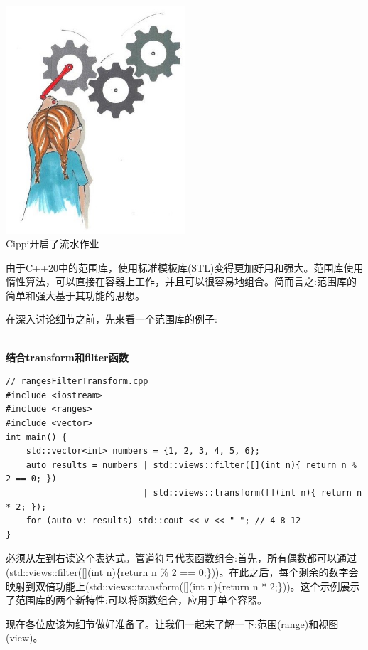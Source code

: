 \begin{center}
\includegraphics[width=0.5\textwidth]{content/3/chapter5/images/2.png}\\
Cippi开启了流水作业
\end{center}

由于C++20中的范围库，使用标准模板库(STL)变得更加好用和强大。范围库使用惰性算法，可以直接在容器上工作，并且可以很容易地组合。简而言之:范围库的简单和强大基于其功能的思想。

在深入讨论细节之前，先来看一个范围库的例子:

\hspace*{\fill} \\ %
\noindent
\textbf{结合transform和filter函数}
\begin{lstlisting}[style=styleCXX]
// rangesFilterTransform.cpp
#include <iostream>
#include <ranges>
#include <vector>
int main() {
	std::vector<int> numbers = {1, 2, 3, 4, 5, 6};
	auto results = numbers | std::views::filter([](int n){ return n % 2 == 0; })
						   | std::views::transform([](int n){ return n * 2; });
	for (auto v: results) std::cout << v << " "; // 4 8 12
}
\end{lstlisting}

必须从左到右读这个表达式。管道符号代表函数组合:首先，所有偶数都可以通过(std::views::filter([](int n)\{return n \% 2 == 0;\}))。在此之后，每个剩余的数字会映射到双倍功能上(std::views::transform([](int n)\{return n * 2;\}))。这个示例展示了范围库的两个新特性:可以将函数组合，应用于单个容器。

现在各位应该为细节做好准备了。让我们一起来了解一下:范围(range)和视图(view)。


